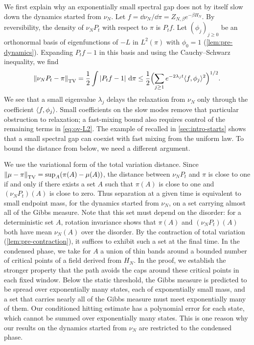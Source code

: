 We first explain why an exponentially small spectral gap does not by itself slow down the dynamics started from $\nu_N$. Let $f=\dd\nu_N/\dd\pi=Z_{N,\beta}e^{-\beta H_N}$. By reversibility, the density of $\nu_NP_t$ with respect to $\pi$ is $P_tf$. Let $(\phi_j)_{j\ge0}$ be an orthonormal basis of eigenfunctions of $-L$ in $L^2(\pi)$ with $\phi_0=1$ (\cref{lem:pre-dynamics}). Expanding $P_tf-1$ in this basis and using the Cauchy--Schwarz inequality, we find
\begin{equation}\label{eq:ov-L2}
\left\lVert\nu_NP_t-\pi\right\rVert_{\mathrm{TV}}=\frac12\int\left|P_tf-1\right|\,\mathrm d\pi\le\frac12\Bigl(\sum_{j\ge1}e^{-2\lambda_jt}\langle f,\phi_j\rangle^2\Bigr)^{1/2}.
\end{equation}
We see that a small eigenvalue $\lambda_j$ delays the relaxation from $\nu_N$ only through the coefficient $\langle f,\phi_j\rangle$. Small coefficients on the slow modes remove that particular obstruction to relaxation; a fast-mixing bound also requires control of the remaining terms in \eqref{eq:ov-L2}. The example of \cite{GheissariGrantYu2026} recalled in \cref{sec:intro-starts} shows that a small spectral gap can coexist with fast mixing from the uniform law. To bound the distance from below, we need a different argument.

We use the variational form of the total variation distance. Since $\left\lVert\mu-\pi\right\rVert_{\mathrm{TV}}=\sup_A(\pi(A)-\mu(A))$, the distance between $\nu_NP_t$ and $\pi$ is close to one if and only if there exists a set $A$ such that $\pi(A)$ is close to one and $(\nu_NP_t)(A)$ is close to zero. Thus separation at a given time is equivalent to small endpoint mass, for the dynamics started from $\nu_N$, on a set carrying almost all of the Gibbs measure. Note that this set must depend on the disorder: for a deterministic set $A$, rotation invariance shows that $\pi(A)$ and $(\nu_NP_t)(A)$ both have mean $\nu_N(A)$ over the disorder. By the contraction of total variation (\cref{lem:pre-contraction}), it suffices to exhibit such a set at the final time. In the condensed phase, we take for $A$ a union of thin bands around a bounded number of critical points of a field derived from $H_N$. In the proof, we establish the stronger property that the path avoids the caps around these critical points in each fixed window. Below the static threshold, the Gibbs measure is predicted to be spread over exponentially many states, each of exponentially small mass, and a set that carries nearly all of the Gibbs measure must meet exponentially many of them. Our conditioned hitting estimate has a polynomial error for each state, which cannot be summed over exponentially many states. This is one reason why our results on the dynamics started from $\nu_N$ are restricted to the condensed phase.


